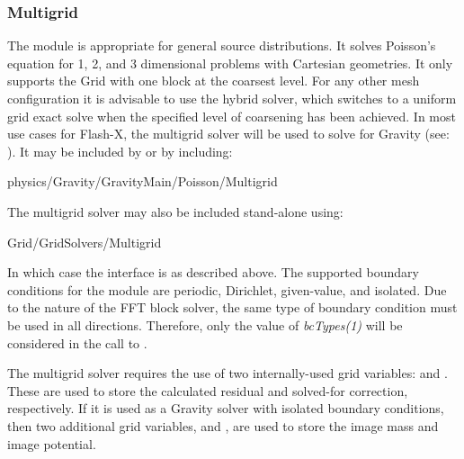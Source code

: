 \subsubsection{Multigrid}
\label{Sec:GridSolversMultigridUsing}

The  module is appropriate for general source
distributions.  It solves Poisson's equation for 1, 2, and 3 dimensional
problems with Cartesian geometries.  It only supports the \Paramesh
Grid with one block at the coarsest level. For any other mesh
configuration it is advisable to use the hybrid solver, which switches
to a uniform grid exact solve when the specified level of coarsening
has been achieved. In most use cases for Flash-X, the multigrid solver
will be used to solve for Gravity (see: ). It may
be included by  or
 by including:
\begin{codeseg}
physics/Gravity/GravityMain/Poisson/Multigrid
\end{codeseg}

The multigrid solver may also be included stand-alone using:
\begin{codeseg}
Grid/GridSolvers/Multigrid
\end{codeseg}

In which case the interface is as described above.  The supported boundary
conditions for the module are periodic, Dirichlet, given-value, and isolated.
Due to the nature of the FFT block solver, the same type of boundary condition
must be used in all directions.  Therefore, only the value of {\it bcTypes(1)}
will be considered in the call to .

The multigrid solver requires the use of two internally-used grid variables:
 and .  These are used to store the calculated residual and solved-for
correction, respectively.  If it is used as a Gravity solver with isolated
boundary conditions, then two additional grid variables,  and
, are used to store the image mass and image potential.  

